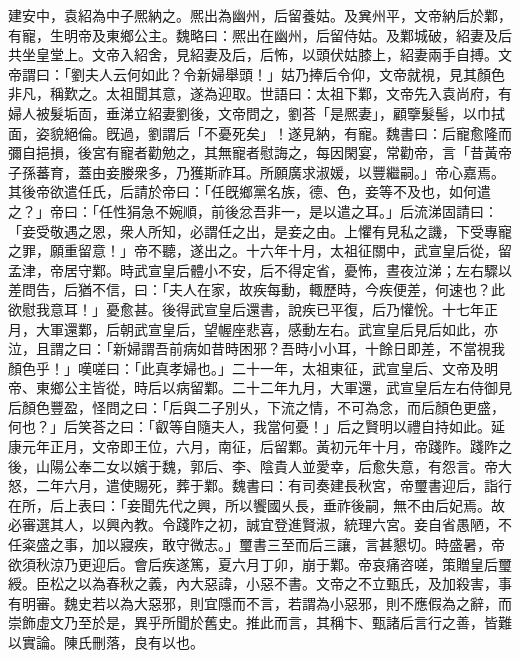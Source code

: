\begin{pinyinscope}
建安中，袁紹為中子熈納之。熈出為幽州，后留養姑。及兾州平，文帝納后於鄴，有寵，生明帝及東鄉公主。魏略曰：熈出在幽州，后留侍姑。及鄴城破，紹妻及后共坐皇堂上。文帝入紹舍，見紹妻及后，后怖，以頭伏姑膝上，紹妻兩手自搏。文帝謂曰：「劉夫人云何如此？令新婦舉頭！」姑乃捧后令仰，文帝就視，見其顏色非凡，稱歎之。太祖聞其意，遂為迎取。世語曰：太祖下鄴，文帝先入袁尚府，有婦人被髮垢靣，垂涕立紹妻劉後，文帝問之，劉荅「是熈妻」，顧擥髮髻，以巾拭面，姿貌絕倫。旣過，劉謂后「不憂死矣」！遂見納，有寵。魏書曰：后寵愈隆而彌自挹損，後宮有寵者勸勉之，其無寵者慰誨之，每因閑宴，常勸帝，言「昔黃帝子孫蕃育，蓋由妾媵衆多，乃獲斯祚耳。所願廣求淑媛，以豐繼嗣。」帝心嘉焉。其後帝欲遣任氏，后請於帝曰：「任旣鄉黨名族，德、色，妾等不及也，如何遣之？」帝曰：「任性狷急不婉順，前後忿吾非一，是以遣之耳。」后流涕固請曰：「妾受敬遇之恩，衆人所知，必謂任之出，是妾之由。上懼有見私之譏，下受專寵之罪，願重留意！」帝不聽，遂出之。十六年十月，太祖征關中，武宣皇后從，留孟津，帝居守鄴。時武宣皇后體小不安，后不得定省，憂怖，晝夜泣涕；左右驟以差問告，后猶不信，曰：「夫人在家，故疾每動，輙歷時，今疾便差，何速也？此欲慰我意耳！」憂愈甚。後得武宣皇后還書，說疾已平復，后乃懽恱。十七年正月，大軍還鄴，后朝武宣皇后，望幄座悲喜，感動左右。武宣皇后見后如此，亦泣，且謂之曰：「新婦謂吾前病如昔時困邪？吾時小小耳，十餘日即差，不當視我顏色乎！」嘆嗟曰：「此真孝婦也。」二十一年，太祖東征，武宣皇后、文帝及明帝、東鄉公主皆從，時后以病留鄴。二十二年九月，大軍還，武宣皇后左右侍御見后顏色豐盈，怪問之曰：「后與二子別乆，下流之情，不可為念，而后顏色更盛，何也？」后笑荅之曰：「叡等自隨夫人，我當何憂！」后之賢明以禮自持如此。延康元年正月，文帝即王位，六月，南征，后留鄴。黃初元年十月，帝踐阼。踐阼之後，山陽公奉二女以嬪于魏，郭后、李、陰貴人並愛幸，后愈失意，有怨言。帝大怒，二年六月，遣使賜死，葬于鄴。魏書曰：有司奏建長秋宮，帝璽書迎后，詣行在所，后上表曰：「妾聞先代之興，所以饗國乆長，垂祚後嗣，無不由后妃焉。故必審選其人，以興內教。令踐阼之初，誠宜登進賢淑，統理六宮。妾自省愚陋，不任粢盛之事，加以寢疾，敢守微志。」璽書三至而后三讓，言甚懇切。時盛暑，帝欲須秋涼乃更迎后。會后疾遂篤，夏六月丁卯，崩于鄴。帝哀痛咨嗟，策贈皇后璽綬。臣松之以為春秋之義，內大惡諱，小惡不書。文帝之不立甄氏，及加殺害，事有明審。魏史若以為大惡邪，則宜隱而不言，若謂為小惡邪，則不應假為之辭，而崇飾虛文乃至於是，異乎所聞於舊史。推此而言，其稱卞、甄諸后言行之善，皆難以實論。陳氏刪落，良有以也。


\end{pinyinscope}
